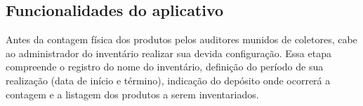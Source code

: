 \subsection{Funcionalidades do aplicativo}

Antes da contagem física dos produtos pelos auditores munidos de coletores, cabe ao administrador do inventário realizar sua devida configuração. Essa etapa compreende o registro do nome do inventário, definição do período de sua realização (data de início e término), indicação do depósito onde ocorrerá a contagem e a listagem dos produtos a serem inventariados.

\begin{figure}[!htb]
    \centering
    \quad
    \quad
    \quad
\end{figure}

